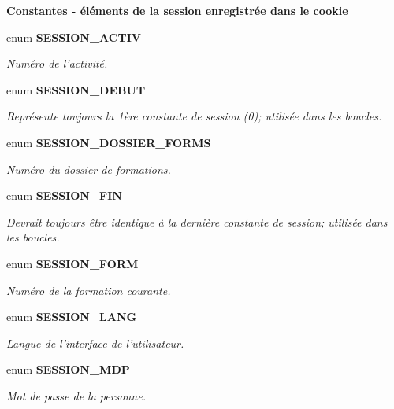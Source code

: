\begin{Indent}{\bf Constantes - éléments de la session enregistrée dans le cookie}\par
\begin{CompactItemize}
\item 
enum {\bf SESSION\_\-ACTIV} 
\begin{CompactList}\small\item\em Numéro de l'activité. \item\end{CompactList}\item 
enum {\bf SESSION\_\-DEBUT} 
\begin{CompactList}\small\item\em Représente toujours la 1ère constante de session (0); utilisée dans les boucles. \item\end{CompactList}\item 
enum {\bf SESSION\_\-DOSSIER\_\-FORMS} 
\begin{CompactList}\small\item\em Numéro du dossier de formations. \item\end{CompactList}\item 
enum {\bf SESSION\_\-FIN} 
\begin{CompactList}\small\item\em Devrait toujours être identique à la dernière constante de session; utilisée dans les boucles. \item\end{CompactList}\item 
enum {\bf SESSION\_\-FORM} 
\begin{CompactList}\small\item\em Numéro de la formation courante. \item\end{CompactList}\item 
enum {\bf SESSION\_\-LANG} 
\begin{CompactList}\small\item\em Langue de l'interface de l'utilisateur. \item\end{CompactList}\item 
enum {\bf SESSION\_\-MDP} 
\begin{CompactList}\small\item\em Mot de passe de la personne. \item\end{CompactList}\item 

\end{CompactItemize}
\end{Indent}
